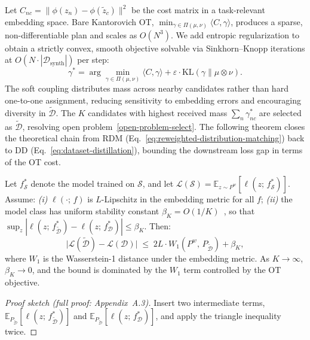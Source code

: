 \begin{foldable} %
  Let $C_{nc} = \|\phi(z_n) - \phi(\tilde{z}_c)\|^2$ be the cost matrix in a task-relevant embedding space.
  Bare Kantorovich OT, $\min_{\gamma \in \Pi(\mu,\nu)} \langle C, \gamma \rangle$, produces a sparse, non-differentiable plan and scales as $O(N^3)$.
  We add entropic regularization to obtain a strictly convex, smooth objective solvable via Sinkhorn--Knopp iterations at $O(N \cdot |\mathcal{D}_\text{synth}|)$ per step:
  \begin{equation}
    \gamma^* = \arg\min_{\gamma \in \Pi(\mu,\nu)} \langle C, \gamma \rangle + \varepsilon \cdot \mathrm{KL}(\gamma \| \mu \otimes \nu).
    \label{eq:ot}
  \end{equation}
  The soft coupling distributes mass across nearby candidates rather than hard one-to-one assignment, reducing sensitivity to embedding errors and encouraging diversity in $\tilde{\mathcal{D}}$.
  The $K$ candidates with highest received mass $\sum_n \gamma^*_{nc}$ are selected as $\tilde{\mathcal{D}}$, resolving open problem~\ref{open-problem-select}.
  The following theorem closes the theoretical chain from RDM (Eq.~\ref{eq:reweighted-distribution-matching}) back to DD (Eq.~\ref{eq:dataset-distillation}), bounding the downstream loss gap in terms of the OT cost.
  \begin{theorem} \label{thm:gap}
    Let $f^*_{\mathcal{S}}$ denote the model trained on $\mathcal{S}$, and let $\mathcal{L}(\mathcal{S}) = \mathbb{E}_{z \sim P^w}[\ell(z;\,f^*_{\mathcal{S}})]$.
    Assume: \emph{(i)} $\ell(\cdot;\,f)$ is $L$-Lipschitz in the embedding metric for all $f$; \emph{(ii)} the model class has uniform stability constant $\beta_K = O(1/K)$~\cite{bousquet2002stability}, so that $\sup_z |\ell(z;\,f^*_{\tilde{\mathcal{D}}}) - \ell(z;\,f^*_\mathcal{D})| \leq \beta_K$.
    Then:
    \begin{equation}
      \bigl|\mathcal{L}(\tilde{\mathcal{D}}) - \mathcal{L}(\mathcal{D})\bigr|
      \;\leq\; 2L \cdot W_1(P^w,\,P_{\tilde{\mathcal{D}}}) + \beta_K,
      \label{eq:gap-bound}
    \end{equation}
    where $W_1$ is the Wasserstein-1 distance under the embedding metric.
    As $K \to \infty$, $\beta_K \to 0$, and the bound is dominated by the $W_1$ term controlled by the OT objective.
  \end{theorem}
  \begin{proof}[Proof sketch (full proof: Appendix~A.3)]
    Insert two intermediate terms, $\mathbb{E}_{P_{\tilde{\mathcal{D}}}}[\ell(z;\,f^*_{\tilde{\mathcal{D}}})]$ and $\mathbb{E}_{P_{\tilde{\mathcal{D}}}}[\ell(z;\,f^*_\mathcal{D})]$, and apply the triangle inequality twice.

\end{proof}
\end{foldable}
